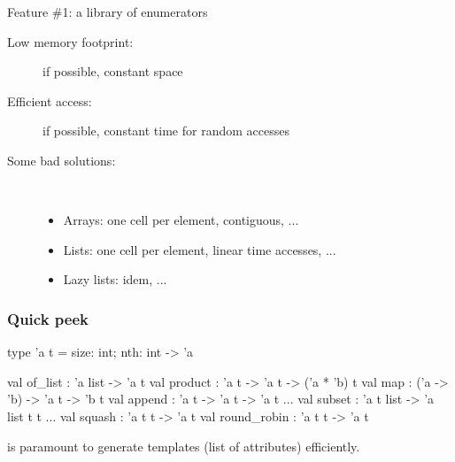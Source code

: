 \documentclass[10pt]{beamer}
\begin{document}
\begin{frame}{Feature \#1: a library of enumerators}
  \begin{description}
  \item[\sc Low memory footprint:] if possible, constant space
  \item[\sc Efficient access:] if possible, constant time for random accesses
  \item[\sc Some bad solutions:] ~
    \begin{itemize}
    \item Arrays: one cell per element, contiguous, ...
    \item Lists: one cell per element, linear time accesses, ...
    \item Lazy lists: idem, ...
    \end{itemize}
\end{description}
\end{frame}

\begin{frame}[fragile]
  \frametitle{Quick peek}

\begin{ocaml}
type 'a t = {size: int; nth: int -> 'a}

val of_list     : 'a list -> 'a t
val product     : 'a t -> 'a t -> ('a * 'b) t
val map         : ('a -> 'b) -> 'a t -> 'b t
val append      : 'a t -> 'a t -> 'a t
...
val subset      : 'a t list -> 'a list t t
...
val squash      : 'a t t -> 'a t
val round_robin : 'a t t -> 'a t
\end{ocaml}

 is paramount to generate templates (list of
attributes) efficiently.

\end{frame}
\end{document}
